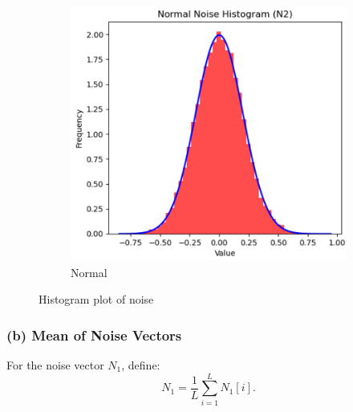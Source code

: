 \documentclass[hidelinks,12pt]{article}
\begin{document}
\begin{figure}[h!]
\begin{subfigure}[b]{0.45\textwidth}
			\includegraphics[width=\textwidth]{figures/normal_noise_dist.PNG}
			\caption{Normal}
		\end{subfigure}
		\caption{Histogram plot of noise}
	\end{figure}
	
	\pagebreak
	
	\subsubsection*{(b) Mean of Noise Vectors}
	For the noise vector $N_1$, define:
	\[ N_1 = \frac{1}{L} \sum_{i=1}^L N_1[i]. \tag{5} \]
	
\end{document}
